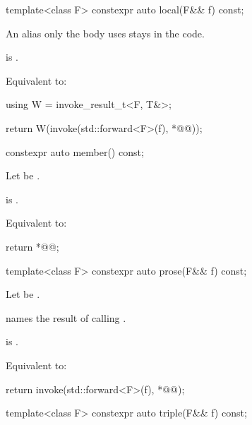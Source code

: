 %
\begin{itemdecl}
template<class F>
  constexpr auto local(F&& f) const;
\end{itemdecl}

\begin{itemdescr}
\pnum
An alias only the body uses stays in the code.

\pnum
\mandates
{} is .

\pnum
\effects
Equivalent to:
\begin{codeblock}
using W = invoke_result_t<F, T&>;

return W(invoke(std::forward<F>(f), *@@));
\end{codeblock}
\end{itemdescr}

%
\begin{itemdecl}
constexpr auto member() const;
\end{itemdecl}

\begin{itemdescr}
\pnum
Let  be .

\pnum
\mandates
{} is .

\pnum
\effects
Equivalent to:
\begin{codeblock}
return *@@;
\end{codeblock}
\end{itemdescr}

%
\begin{itemdecl}
template<class F>
  constexpr auto prose(F&& f) const;
\end{itemdecl}

\begin{itemdescr}
\pnum
Let  be .

\pnum
{} names the result of calling .

\pnum
\mandates
{} is .

\pnum
\effects
Equivalent to:
\begin{codeblock}
return invoke(std::forward<F>(f), *@@);
\end{codeblock}
\end{itemdescr}

%
\begin{itemdecl}
template<class F>
  constexpr auto triple(F&& f) const;
\end{itemdecl}

